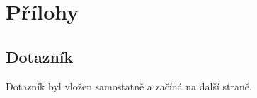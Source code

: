 \documentclass[12pt,a4paper]{report}
\let\openright=\clearpage
\begin{document}
\appendix
\chapter{Přílohy}

\section{Dotazník}\label{appendix-quest}
Dotazník byl vložen samostatně a začíná na další straně.


\openright{}
\end{document}
